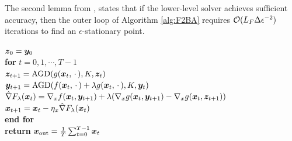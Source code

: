\documentclass{article}
\begin{document}
The second lemma from \citep{chen2023near}, states that if the lower-level solver achieves sufficient accuracy, then the outer loop of Algorithm \ref{alg:F2BA} requires ${\mathcal{O}}(L_F \Delta \epsilon^{-2})$ iterations to find an $\epsilon$-stationary point.

\begin{algorithm*}[t]  
\caption{F${}^2$BA${}^+$ $(f,g, \eta_x, T, K,\vx_0,\vz_0)$} \label{alg:F2BA}
\begin{algorithmic}[1] 
\STATE $ {\bm{z}}_0 = {\bm{y}}_0$ \\[1mm]
\STATE \textbf{for} $ t =0,1,\cdots,T-1 $ \\[1mm]
\STATE \quad ${\bm{z}}_{t+1} = \text{AGD}( g({\bm{x}}_t,\,\cdot\,), K, {\bm{z}}_t)$ \\[1mm]
\STATE \quad ${\bm{y}}_{t+1} = \text{AGD} (f({\bm{x}}_t,\,\cdot\,) + \lambda g({\bm{x}}_t, \,\cdot\,) , K, {\bm{y}}_t    )$ \\[1mm]
\STATE \quad $ \hat \nabla F_\lambda({\bm{x}}_t)= \nabla_x f({\bm{x}}_t,{\bm{y}}_{t+1}) + \lambda ( \nabla_x g({\bm{x}}_t,{\bm{y}}_{t+1}) - \nabla_x g({\bm{x}}_t,{\bm{z}}_{t+1}) )$ \\[1mm]
\STATE \quad  ${\bm{x}}_{t+1} = {\bm{x}}_t -  \eta_x  \hat \nabla F_{\lambda}({\bm{x}}_t)$ \\[1mm]
\STATE \textbf{end for} \\[1mm]
\STATE \textbf{return} ${\bm{x}}_{\rm out} = \frac{1}{T} \sum_{t=0}^{T-1} {\bm{x}}_{t}$ \\[1mm]
\end{algorithmic}
\end{algorithm*}
\end{document}
